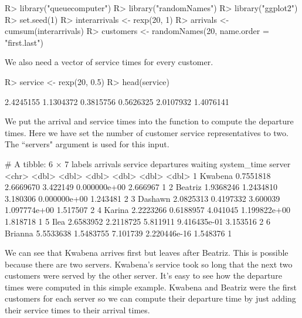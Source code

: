 \documentclass[article]{jss}
\begin{document}
\begin{CodeChunk}
\begin{CodeInput}
R> library("queuecomputer")
R> library("randomNames") 
R> library("ggplot2")
R> set.seed(1) 
R> interarrivals <- rexp(20, 1)
R> arrivals <- cumsum(interarrivals)
R> customers <- randomNames(20, name.order = "first.last")
\end{CodeInput}
\end{CodeChunk}

We also need a vector of service times for every customer.

\begin{CodeChunk}
\begin{CodeInput}
R> service <- rexp(20, 0.5)
R> head(service)
\end{CodeInput}
\begin{CodeOutput}
[1] 2.4245155 1.1304372 0.3815756 0.5626325 2.0107932 1.4076141
\end{CodeOutput}
\end{CodeChunk}

We put the arrival and service times into the  function to compute the departure times. Here we have set the number of customer service representatives to two. The ``servers" argument is used for this input. 

\begin{CodeChunk}
\begin{CodeOutput}
# A tibble: 6 × 7
   labels  arrivals   service departures      waiting system_time server
    <chr>     <dbl>     <dbl>      <dbl>        <dbl>       <dbl>  <dbl>
1 Kwabena 0.7551818 2.6669670   3.422149 0.000000e+00    2.666967      1
2 Beatriz 1.9368246 1.2434810   3.180306 0.000000e+00    1.243481      2
3 Dashawn 2.0825313 0.4197332   3.600039 1.097774e+00    1.517507      2
4  Karina 2.2223266 0.6188957   4.041045 1.199822e+00    1.818718      1
5    Ilea 2.6583952 2.2118725   5.811911 9.416435e-01    3.153516      2
6 Brianna 5.5533638 1.5483755   7.101739 2.220446e-16    1.548376      1
\end{CodeOutput}
\end{CodeChunk}

We can see that Kwabena arrives first but leaves after Beatriz. This is possible because there are two servers. Kwabena's service took so long that the next two customers were served by the other server. It's easy to see how the departure times were computed in this simple example. Kwabena and Beatriz were the first customers for each server so we can compute their departure time by just adding their service times to their arrival times.
\end{document}
